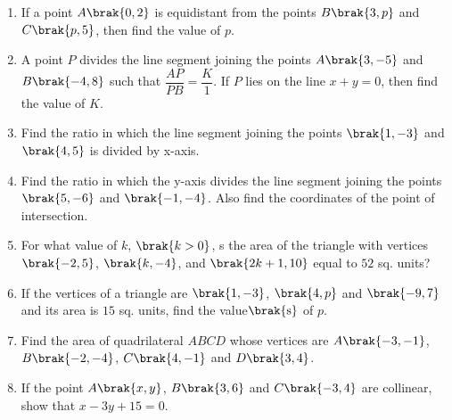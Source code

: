 \begin{enumerate}
\item If a point $A\brak{0,2}$ is equidistant from the points $B\brak{3,p}$ and $C\brak{p,5}$, then find the value of $p$. 
\item A point $P$ divides the line segment joining the points $A\brak{3,-5}$ and $B\brak{-4,8}$ such that $\dfrac{AP}{PB} = \dfrac{K}{1}$. If $P$ lies on the line $x + y = 0$, then find the value of $K$. 
\item Find the ratio in which the line segment joining the points $\brak{1,-3}$ and $\brak{4,5}$ is divided by x-axis. 
\item Find the ratio in which the y-axis divides the line segment joining the points $\brak{5,-6}$ and $\brak{-1,-4}$. Also find the coordinates of the point of intersection. 

\item For what value of $k$, $\brak{ k > 0}$, s the area of the triangle with vertices $\brak{-2,5}$, $\brak{k,-4}$, and $\brak{2k+1,10}$ equal to $52$ sq. units? 

\item If the vertices of a triangle are $\brak{1,-3}$, $\brak{4,p}$ and $\brak{-9,7}$ and its area is $15$ sq. units, find the value$\brak{\text{s}}$ of $p$. 
\item Find the area of quadrilateral $ABCD$ whose vertices are $A\brak{-3,-1}$, $B\brak{-2,-4}$, $C\brak{4,-1}$ and $D\brak{3,4}$.

\item If the point $A\brak{x,y}$, $B\brak{3,6}$ and $C\brak{-3,4}$ are collinear, show that $x - 3y + 15 = 0$. 
\end{enumerate}
